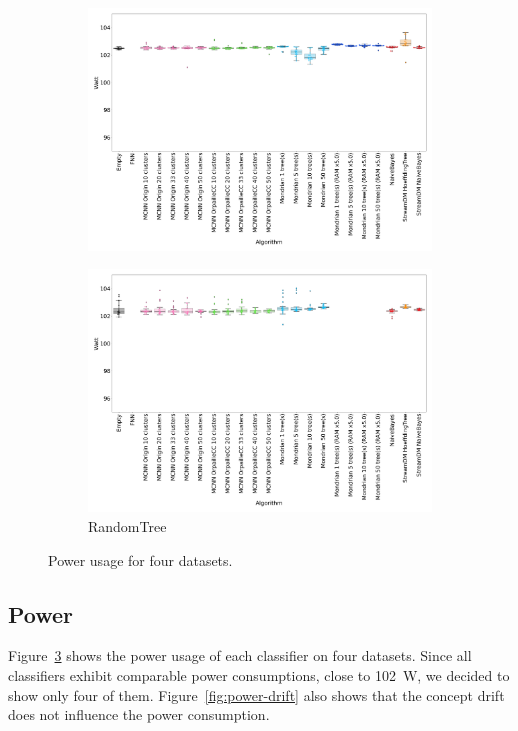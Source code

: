 \begin{figure}
\begin{subfigure}[t]{.49\linewidth}
		\includegraphics[width=\linewidth]{figures/results/recofit_6_watt.png}
		\caption{\recofitdataset}
		\label{fig:power-recofit}
	\end{subfigure}
	\hfill
	\begin{subfigure}[t]{.49\linewidth}
		\includegraphics[width=\linewidth]{figures/results/dataset_3_watt.png}
		\caption{RandomTree}
		\label{fig:power-dataset_3}
	\end{subfigure}
	\caption{Power usage for four datasets.}
	\label{fig:power}
\end{figure}
\subsection{Power}
\label{sec:result-power}
Figure~\ref{fig:power} shows the power usage of each classifier on four
datasets. Since all classifiers exhibit comparable power consumptions, close to
102~W, we decided to show only four of them. Figure~\ref{fig:power-drift} also
shows that the concept drift does not influence the power consumption.

